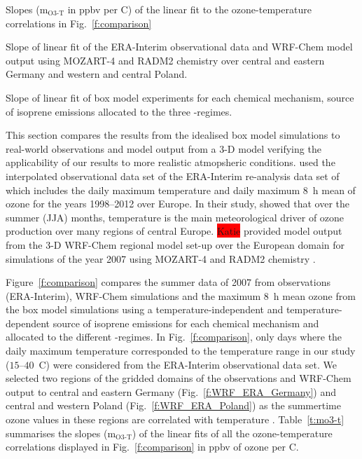 \begin{table}[t]%
    \centering%
    \caption{Slopes (m$_{\text{O3-T}}$ in ppbv per \degree C) of the linear fit to the ozone-temperature correlations in Fig.~\ref{f:comparison}}%
    \label{t:mo3-t}%
    \begin{subtable}[t]{\textwidth}%
        \centering%
        \vspace{2mm}%
        \caption{Slope of linear fit of the ERA-Interim observational data and WRF-Chem model output using MOZART-4 and RADM2 chemistry over central and eastern Germany and western and central Poland.}%
        \label{t:era_wrf_o3-T}%
    \end{subtable}
    \begin{subtable}[t]{\textwidth}%
        \centering%
        \vspace{2mm}
        \caption{Slope of linear fit of box model experiments for each chemical mechanism, source of isoprene emissions allocated to the three -regimes.}%
        \label{t:boxmodel_o3-T}%
    \end{subtable}
\end{table} 

This section compares the results from the idealised box model simulations to real-world observations and model output from a 3-D model verifying the applicability of our results to more realistic atmopsheric conditions.
\citet{Otero:2016} used the interpolated observational data set of the ERA-Interim re-analysis data set of \citet{Schnell:2015} which includes the daily maximum temperature and daily maximum 8~h mean of ozone for the years 1998--2012 over Europe.
In their study, \citet{Otero:2016} showed that over the summer (JJA) months, temperature is the main meteorological driver of ozone production over many regions of central Europe.
\colorbox{red}{Katie} provided model output from the 3-D WRF-Chem regional model set-up over the European domain for simulations of the year 2007 using MOZART-4 and RADM2 chemistry .

Figure~\ref{f:comparison} compares the summer data of 2007 from observations (ERA-Interim), WRF-Chem simulations and the maximum 8~h mean ozone from the box model simulations using a temperature-independent and temperature-dependent source of isoprene emissions for each chemical mechanism and allocated to the different -regimes.
In Fig.~\ref{f:comparison}, only days where the daily maximum temperature corresponded to the temperature range in our study ($15$--$40$~\degree C) were considered from the ERA-Interim observational data set.
We selected two regions of the gridded domains of the observations and WRF-Chem output to central and eastern Germany (Fig.~\ref{f:WRF_ERA_Germany}) and central and western Poland (Fig.~\ref{f:WRF_ERA_Poland}) as the summertime ozone values in these regions are correlated with temperature \citep{Otero:2016}.
Table~\ref{t:mo3-t} summarises the slopes (m$_{\text{O3-T}}$) of the linear fits of all the ozone-temperature correlations displayed in Fig.~\ref{f:comparison} in ppbv of ozone per \degree C.

